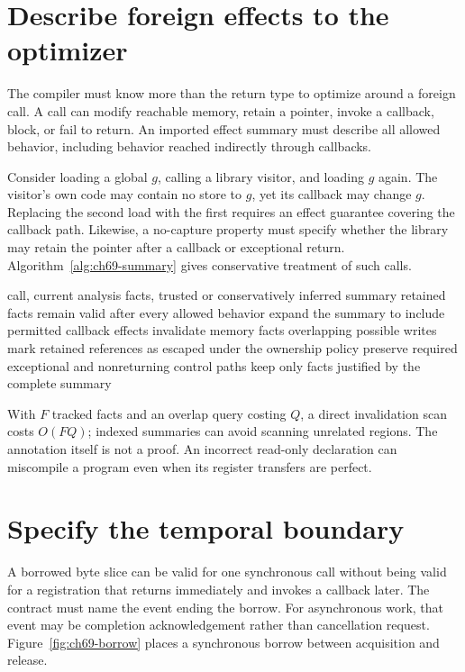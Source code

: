 \section{Describe foreign effects to the optimizer}
\label{sec:ch69-effects}
The compiler must know more than the return type to optimize around a foreign call.
A call can modify reachable memory, retain a pointer, invoke a callback, block, or fail to return.
An imported effect summary must describe all allowed behavior, including behavior reached indirectly through callbacks.

Consider loading a global $g$, calling a library visitor, and loading $g$ again.
The visitor's own code may contain no store to $g$, yet its callback may change $g$.
Replacing the second load with the first requires an effect guarantee covering the callback path.
Likewise, a no-capture property must specify whether the library may retain the pointer after a callback or exceptional return.
Algorithm~\ref{alg:ch69-summary} gives conservative treatment of such calls.

\begin{algorithm}[htbp]
\caption{Apply an imported effect contract conservatively.}
\label{alg:ch69-summary}
\begin{pseudocode}
\Require call, current analysis facts, trusted or conservatively inferred summary
\Ensure retained facts remain valid after every allowed behavior
\State expand the summary to include permitted callback effects
\State invalidate memory facts overlapping possible writes
\State mark retained references as escaped under the ownership policy
\State preserve required exceptional and nonreturning control paths
\State keep only facts justified by the complete summary
\end{pseudocode}
\end{algorithm}

With $F$ tracked facts and an overlap query costing $Q$, a direct invalidation scan costs $O(FQ)$; indexed summaries can avoid scanning unrelated regions.
The annotation itself is not a proof.
An incorrect read-only declaration can miscompile a program even when its register transfers are perfect.

\section{Specify the temporal boundary}
\label{sec:ch69-time}
A borrowed byte slice can be valid for one synchronous call without being valid for a registration that returns immediately and invokes a callback later.
The contract must name the event ending the borrow.
For asynchronous work, that event may be completion acknowledgement rather than cancellation request.
Figure~\ref{fig:ch69-borrow} places a synchronous borrow between acquisition and release.

